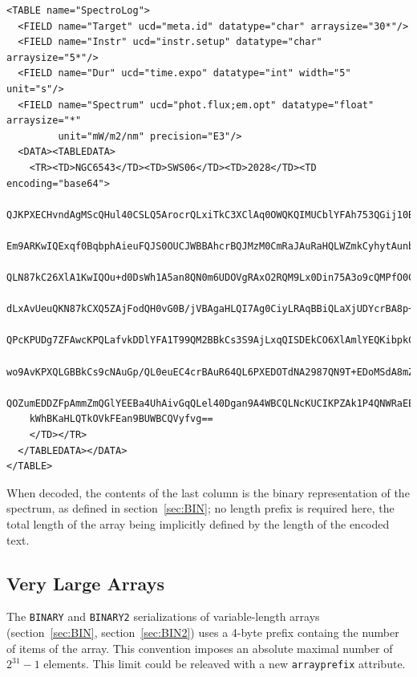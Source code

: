 \documentclass[11pt,a4paper]{ivoa}
\def\Aref#1{section~\ref{#1}}
\let\fg=\color
\def\attr#1{{\tt{\fg{DarkRed}#1}}}
\def\elem#1{{\tt{\fg{DarkRed}#1}}}
\begin{document}
{{{\begin{verbatim}
<TABLE name="SpectroLog">
  <FIELD name="Target" ucd="meta.id" datatype="char" arraysize="30*"/>
  <FIELD name="Instr" ucd="instr.setup" datatype="char" arraysize="5*"/>
  <FIELD name="Dur" ucd="time.expo" datatype="int" width="5" unit="s"/>
  <FIELD name="Spectrum" ucd="phot.flux;em.opt" datatype="float" arraysize="*"
         unit="mW/m2/nm" precision="E3"/>
  <DATA><TABLEDATA>
    <TR><TD>NGC6543</TD><TD>SWS06</TD><TD>2028</TD><TD encoding="base64">
    QJKPXECHvndAgMScQHul40CSLQ5ArocrQLxiTkC3XClAq0OWQKQIMUCblYFAh753QGij10BT
    Em9ARKwIQExqf0BqbphAieuFQJS0OUCJWBBAhcrBQJMzM0CmRaJAuRaHQLWZmkCyhytAunbJ
    QLN87kC26XlA1KwIQOu+d0DsWh1A5an8QN0m6UDOVgRAxO2RQM9Lx0Din75A3o9cQMPfO0C/
    dLxAvUeuQKN87kCXQ5ZAjFodQH0vG0B/jVBAgaHLQI7Ag0CiyLRAqBBiQLaXjUDYcrBA8p++
    QPcKPUDg7ZFAwcKPQLafvkDDlYFA1T99QM2BBkCs3S9AjLxqQISDEkCO6XlAmlYEQKibpkC5
    wo9AvKPXQLGBBkCs9cNAuGp/QL0euEC4crBAuR64QL6PXEDOTdNA2987QN9T+EDoMSdA8mZm
    QOZumEDDZFpAmmZmQGlYEEBa4UhAivGqQLel40Dgan9A4WBCQLNcKUCIKPZAk1P4QNWRaEEP
    kWhBKaHLQTkOVkFEan9BUWBCQVyfvg==
    </TD></TR>
  </TABLEDATA></DATA>
</TABLE>
\end{verbatim}
\par

\noindent
When decoded, the contents of the last column is the binary representation
of the spectrum, as defined in \Aref{sec:BIN};
no length prefix is required here, the total length of the array being
implicitly defined by the length of the encoded text.

\subsection{Very Large Arrays}
The \elem{BINARY} and \elem{BINARY2} serializations of variable-length arrays
(\Aref{sec:BIN}, \Aref{sec:BIN2}) uses a 4-byte prefix containg the number of
items of the array. This convention imposes an absolute maximal
number of $2^{31}-1$ elements. This limit could be releaved
with a new \attr{arrayprefix} attribute.

}}}
\end{document}
